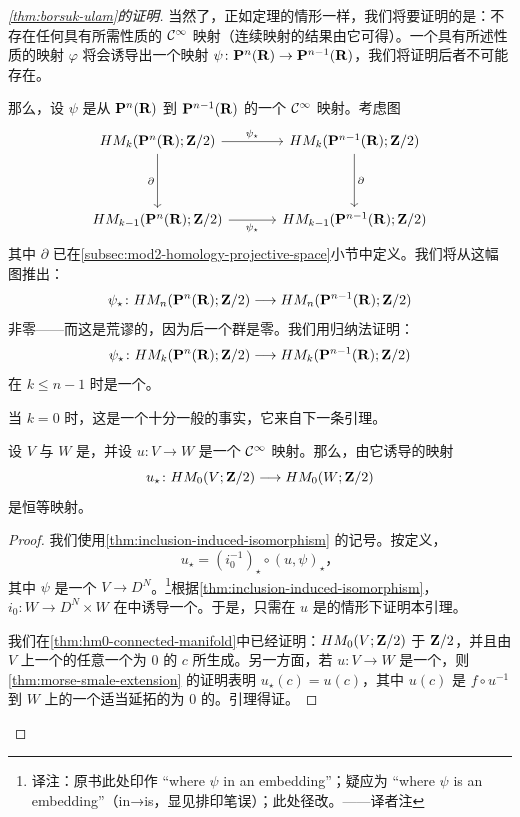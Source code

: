 \begin{proof}[\cref{thm:borsuk-ulam}的证明]
当然了，正如\trBrouwer{}定理的情形一样，我们将要证明的是：不存在任何具有所需性质的 $\mathcal{C}^\infty$ 映射（连续映射的结果由它可得）。一个具有所述性质的映射 $\varphi$ 将会诱导出一个映射 $\psi\colon\mathbf{P}^n(\mathbf{R})\to\mathbf{P}^{n-1}(\mathbf{R})$，我们将证明后者不可能存在。

那么，设 $\psi$ 是从 $\mathbf{P}^n(\mathbf{R})$ 到 $\mathbf{P}^{n-1}(\mathbf{R})$ 的一个 $\mathcal{C}^\infty$ 映射。考虑图
\[
\begin{tikzcd}[column sep=1.2cm,row sep=1.35cm]
HM_k(\CP^n(\RR);\ZZ/2) \ar[r,"\psi_\star"] \ar[d,"\partial"']
  & HM_k(\CP^{n-1}(\RR);\ZZ/2) \ar[d,"\partial"] \\
HM_{k-1}(\CP^n(\RR);\ZZ/2) \ar[r,"\psi_\star"']
  & HM_{k-1}(\CP^{n-1}(\RR);\ZZ/2)
\end{tikzcd}
\]
其中\trConnectingHomomorphism{} $\partial$ 已在\cref{subsec:mod2-homology-projective-space}小节中定义。我们将从这幅图推出：
\[
\psi_\star\colon HM_n(\mathbf{P}^n(\mathbf{R});\mathbf{Z}/2)\longrightarrow HM_n(\mathbf{P}^{n-1}(\mathbf{R});\mathbf{Z}/2)
\]
非零——而这是荒谬的，因为后一个群是零。我们用归纳法证明：
\[
\psi_\star\colon HM_k(\mathbf{P}^n(\mathbf{R});\mathbf{Z}/2)\longrightarrow HM_k(\mathbf{P}^{n-1}(\mathbf{R});\mathbf{Z}/2)
\]
在 $k\le n-1$ 时是一个\trIsomorphism。

当 $k=0$ 时，这是一个十分一般的事实，它来自下一条引理。

\begin{lemma}\label{thm:hm0-identity-map}
设 $V$ 与 $W$ 是\trConnected\trManifold，并设 $u\colon V\to W$ 是一个 $\mathcal{C}^\infty$ 映射。那么，由它诱导的映射
\[
u_\star\colon HM_0(V;\mathbf{Z}/2)\longrightarrow HM_0(W;\mathbf{Z}/2)
\]
是恒等映射。
\end{lemma}

\begin{proof}
我们使用\cref{thm:inclusion-induced-isomorphism} 的记号。按定义，
\[
u_\star=(i_0^{-1})_\star\circ(u,\psi)_\star\text{，}
\]
其中 $\psi$ 是一个\trEmbedding{} $V\to D^N$。\footnote{译注：原书此处印作 “where $\psi$ in an embedding”；疑应为 “where $\psi$ is an embedding”（in→is，显见排印笔误）；此处径改。——译者注}根据\cref{thm:inclusion-induced-isomorphism}，$i_0\colon W\to D^N\times W$ 在\trHomology{}中诱导一个\trIsomorphism。于是，只需在 $u$ 是\trEmbedding{}的情形下证明本引理。

我们在\cref{thm:hm0-connected-manifold}中已经证明：$HM_0(V;\mathbf{Z}/2)$ \trIsomorphic{}于 $\mathbf{Z}/2$，并且由 $V$ 上一个\trMorseFunction{}的任意一个\trIndex{}为 $0$ 的\trCriticalPoint{} $c$ 所生成。另一方面，若 $u\colon V\to W$ 是一个\trEmbedding，则\cref{thm:morse-smale-extension} 的证明表明 $u_\star(c)=u(c)$，其中 $u(c)$ 是 $f\circ u^{-1}$ 到 $W$ 上的一个适当延拓的\trIndex{}为 $0$ 的\trCriticalPoint。引理得证。
\end{proof}


\end{proof}
